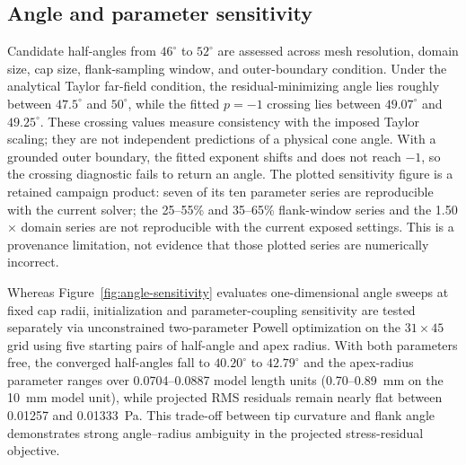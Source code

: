 \subsection{Angle and parameter sensitivity}
Candidate half-angles from $46^\circ$ to $52^\circ$ are assessed across mesh resolution, domain size, cap size, flank-sampling window, and outer-boundary condition. Under the analytical Taylor far-field condition, the residual-minimizing angle lies roughly between $47.5^\circ$ and $50^\circ$, while the fitted $p=-1$ crossing lies between $49.07^\circ$ and $49.25^\circ$. These crossing values measure consistency with the imposed Taylor scaling; they are not independent predictions of a physical cone angle. With a grounded outer boundary, the fitted exponent shifts and does not reach $-1$, so the crossing diagnostic fails to return an angle. The plotted sensitivity figure is a retained campaign product: seven of its ten parameter series are reproducible with the current solver; the 25--55\% and 35--65\% flank-window series and the 1.50$\times$ domain series are not reproducible with the current exposed settings. This is a provenance limitation, not evidence that those plotted series are numerically incorrect.

Whereas Figure~\ref{fig:angle-sensitivity} evaluates one-dimensional angle sweeps at fixed cap radii, initialization and parameter-coupling sensitivity are tested separately via unconstrained two-parameter Powell optimization on the $31\times45$ grid using five starting pairs of half-angle and apex radius. With both parameters free, the converged half-angles fall to $40.20^\circ$ to $42.79^\circ$ and the apex-radius parameter ranges over 0.0704--0.0887 model length units (0.70--0.89~mm on the 10~mm model unit), while projected RMS residuals remain nearly flat between 0.01257 and 0.01333~Pa. This trade-off between tip curvature and flank angle demonstrates strong angle--radius ambiguity in the projected stress-residual objective.

